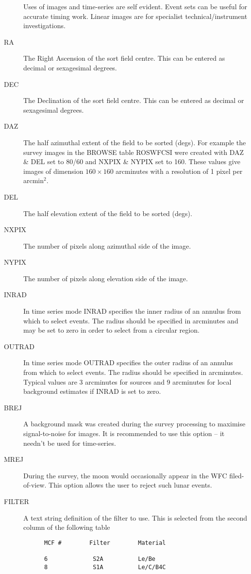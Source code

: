 \begin{description}
Uses of images and time-series are self evident.  Event sets can be
useful for accurate timing work.  Linear images are for specialist
technical/instrument investigations.
\item[RA]
The Right Ascension of the sort field centre. This can be entered as
decimal or sexagesimal degrees.
\item[DEC]
The Declination of the sort field centre. This can be entered as
decimal or sexagesimal degrees.
\item[DAZ]
The half azimuthal extent of the field to be sorted (degs).  For example the 
survey images in the BROWSE table ROSWFCSI were created with DAZ \& DEL set to 
80/60 and NXPIX \& NYPIX set to 160.  These values give images of dimension 
$160 \times 160$ arcminutes with a resolution of 1 pixel per arcmin$^{2}$.
\item[DEL]
The half elevation extent of the field to be sorted (degs).
\item[NXPIX]
The number of pixels along azimuthal side of the image. 
\item[NYPIX]
The number of pixels along elevation side of the image. 
\item[INRAD]
In time series mode INRAD specifies the inner radius of an annulus
from which to select events. The radius should be specified in arcminutes
and may be set to zero in order to select from a circular region.
\item[OUTRAD]
In time series mode OUTRAD specifies the outer radius of an annulus
from which to select events. The radius should be specified in
arcminutes.  Typical values are 3 arcminutes for sources and 9 arcminutes
for local background estimates if INRAD is set to zero.
\item[BREJ ]
A background mask was created during the survey processing to
maximise signal-to-noise for images.  It is recommended to use this
option -- it needn't be used for time-series.
\item[MREJ ]
During the survey, the moon would occasionally appear in the WFC
filed-of-view.  This option allows the user to reject such lunar events.
\item[FILTER]
A text string definition of the filter to use. This is selected from
the second column of the following table

\begin{verbatim}
      MCF #        Filter        Material

      6             S2A          Le/Be
      8             S1A          Le/C/B4C
 

\end{verbatim}
\end{description}
